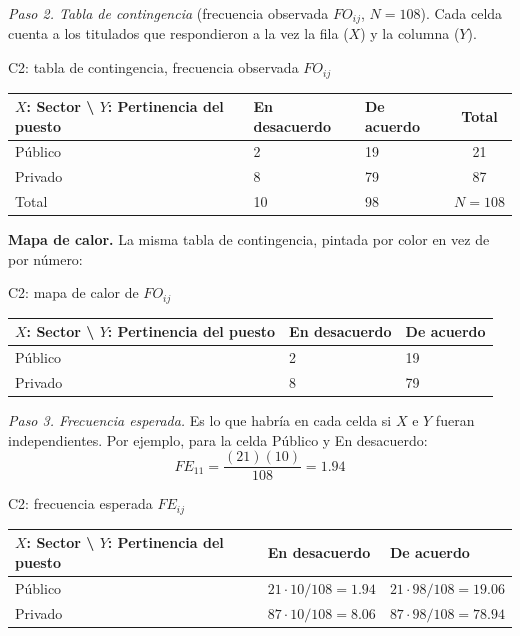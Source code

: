 \textit{Paso 2. Tabla de contingencia} (frecuencia observada $FO_{ij}$, $N = 108$). Cada celda cuenta a los titulados que respondieron a la vez la fila ($X$) y la columna ($Y$).

\begin{mitabla}{C2: tabla de contingencia, frecuencia observada $FO_{ij}$}
\begin{tabular}{L{3.8cm}C{3.00cm}C{3.00cm}|c}
\toprule
$X$: Sector \textbackslash{} $Y$: Pertinencia del puesto & En desacuerdo & De acuerdo & Total \\
\midrule
Público & 2 & 19 & 21 \\
Privado & 8 & 79 & 87 \\
\midrule
Total & 10 & 98 & $N = 108$ \\
\bottomrule
\end{tabular}
\end{mitabla}

\textbf{Mapa de calor.} La misma tabla de contingencia, pintada por color en vez de por número:

\begin{mitabla}{C2: mapa de calor de $FO_{ij}$}
\begin{tabular}{L{3.8cm}C{3.00cm}C{3.00cm}}
\toprule
$X$: Sector \textbackslash{} $Y$: Pertinencia del puesto & En desacuerdo & De acuerdo \\
\midrule
Público & 2 & 19 \\
Privado & 8 & 79 \\
\bottomrule
\end{tabular}
\end{mitabla}

\textit{Paso 3. Frecuencia esperada.} Es lo que habría en cada celda si $X$ e $Y$ fueran independientes. Por ejemplo, para la celda Público y En desacuerdo:
\[
FE_{11} = \frac{(21)(10)}{108} = 1.94
\]

\begin{mitabla}{C2: frecuencia esperada $FE_{ij}$}
\begin{tabular}{L{3.8cm}C{3.00cm}C{3.00cm}}
\toprule
$X$: Sector \textbackslash{} $Y$: Pertinencia del puesto & En desacuerdo & De acuerdo \\
\midrule
Público & $21\cdot10/108 = 1.94$ & $21\cdot98/108 = 19.06$ \\
Privado & $87\cdot10/108 = 8.06$ & $87\cdot98/108 = 78.94$ \\
\bottomrule
\end{tabular}
\end{mitabla}

